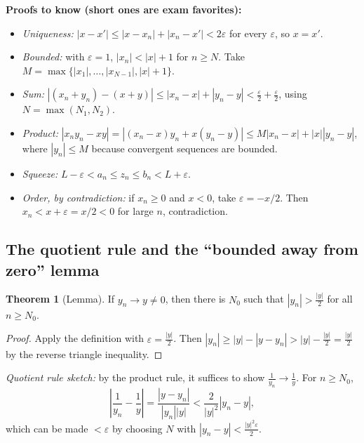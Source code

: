 \documentclass[11pt]{article}
\theoremstyle{definition}
\newtheorem{thm}[defn]{Theorem}
\newcommand{\eps}{\varepsilon}
\newcommand{\key}[1]{\textcolor{red!70!black}{\textbf{#1}}}
\begin{document}
\noindent\key{Proofs to know (short ones are exam favorites):}
\begin{itemize}
  \item \emph{Uniqueness:} $|x-x'|\le|x-x_n|+|x_n-x'|<2\eps$ for every
        $\eps$, so $x=x'$.
  \item \emph{Bounded:} with $\eps=1$, $|x_n|<|x|+1$ for $n\ge N$. Take
        $M=\max\{|x_1|,\dots,|x_{N-1}|,|x|+1\}$.
  \item \emph{Sum:} $|(x_n+y_n)-(x+y)|\le|x_n-x|+|y_n-y|<\frac\eps2+\frac\eps2$,
        using $N=\max(N_1,N_2)$.
  \item \emph{Product:} $|x_ny_n-xy|=|(x_n-x)y_n+x(y_n-y)|\le M|x_n-x|+|x||y_n-y|$,
        where $|y_n|\le M$ because convergent sequences are bounded.
  \item \emph{Squeeze:} $L-\eps<a_n\le z_n\le b_n<L+\eps$.
  \item \emph{Order, by contradiction:} if $x_n\ge0$ and $x<0$, take
        $\eps=-x/2$. Then $x_n<x+\eps=x/2<0$ for large $n$, contradiction.
\end{itemize}

\subsection{The quotient rule and the ``bounded away from zero'' lemma}
\begin{thm}[Lemma]
If $y_n\to y\ne0$, then there is $N_0$ such that $|y_n|>\frac{|y|}{2}$ for
all $n\ge N_0$.
\end{thm}
\begin{proof}
Apply the definition with $\eps=\frac{|y|}2$. Then
$|y_n|\ge|y|-|y-y_n|>|y|-\frac{|y|}2=\frac{|y|}2$ by the reverse triangle
inequality.
\end{proof}
\noindent\emph{Quotient rule sketch:} by the product rule, it suffices to
show $\frac1{y_n}\to\frac1y$. For $n\ge N_0$,
\[
\left|\frac1{y_n}-\frac1y\right|=\frac{|y-y_n|}{|y_n||y|}<\frac{2}{|y|^2}|y_n-y|,
\]
which can be made $<\eps$ by choosing $N$ with $|y_n-y|<\frac{|y|^2\eps}{2}$.
\end{document}
